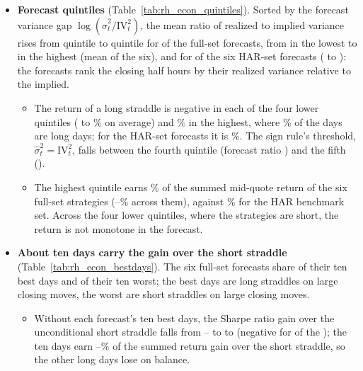 \begin{itemize}
  positive return on only \rhedLongPosMin--\rhedLongPosMax\% of its long days, so its mean return on those days comes
  from a few large moves.
\item \textbf{Forecast quintiles} (Table~\ref{tab:rh_econ_quintiles}). Sorted by the forecast variance gap
  $\log(\hat\sigma^2_t/\mathrm{IV}_t^2)$, the mean ratio of realized to implied variance rises from quintile to
  quintile for \rhedQMonoN{} of the \rhedNFull{} full-set forecasts, from \rhedQOneRVIV{} in the lowest to \rhedQFiveRVIV{} in the
  highest (mean of the six), and for \rhedHarQMonoN{} of the six HAR-set forecasts (\rhedHarQOneRVIV{} to
  \rhedHarQFiveRVIV): the forecasts rank the closing half hours by their realized variance relative to the implied.
  \begin{itemize}
  \item The return of a long straddle is negative in each of the four lower quintiles (\rhedQLowRMin{} to
    \rhedQLowRMax\% on average) and \rhedQFiveR\% in the highest, where \rhedQFiveLong\% of the days are long days;
    for the HAR-set forecasts it is \rhedHarQFiveR\%. The sign rule's threshold, $\hat\sigma^2_t =
    \mathrm{IV}_t^2$, falls between the fourth quintile (forecast ratio \rhedQFourFc) and the fifth
    (\rhedQFiveFc).
  \item The highest quintile earns \rhedQFiveShare\% of the summed mid-quote return of the six full-set strategies
    (\rhedQFiveShareRngMin--\rhedQFiveShareRngMax\% across them), against \rhedHarQFiveShare\% for the HAR benchmark
    set. Across the four lower quintiles, where the strategies are short, the return is not monotone in the forecast.
  \end{itemize}
\item \textbf{About ten days carry the gain over the short straddle} (Table~\ref{tab:rh_econ_bestdays}). The six
  full-set forecasts share \rhedBestAllSix{} of their ten best days and \rhedWorstAllSix{} of their ten worst; the
  best days are long straddles on large closing moves, the worst are short straddles on large closing moves.
  \begin{itemize}
  \item Without each forecast's ten best days, the Sharpe ratio gain over the unconditional short straddle falls from
    \rhedDShortAllMin--\rhedDShortAllMax{} to \rhedDShortExBestMin{} to \rhedDShortExBestMax{} (negative for
    \rhedDShortExBestNeg{} of the \rhedNFull); the ten days earn \rhedBestShareMin--\rhedBestShareMax\% of the summed return
    gain over the short straddle, so the other long days lose on balance.

\end{itemize}
\end{itemize}
